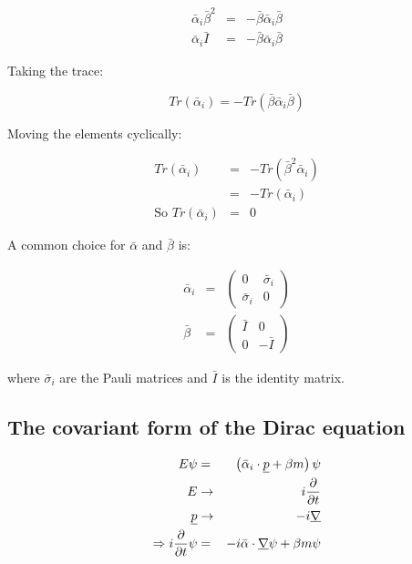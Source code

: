 \begin{eqnarray*}
  \bar{\alpha}_i\bar{\beta}^2 & = & -\bar{\beta}\bar{\alpha}_i\bar{\beta} \\
  \bar{\alpha}_i\bar{I} & = & -\bar{\beta}\bar{\alpha}_i\bar{\beta}
\end{eqnarray*}

Taking the trace:

\[
  Tr\left(\bar{\alpha}_i\right) = -Tr\left(\bar{\beta}\bar{\alpha}_i\bar{\beta}\right)
\]

Moving the elements cyclically:

\begin{eqnarray*}
  Tr\left(\bar{\alpha}_i\right) & = & - Tr\left(\bar{\beta}^2\bar{\alpha}_i\right) \\
  & = & - Tr\left(\bar{\alpha}_i\right) \\
  \textrm{So } Tr\left(\bar{\alpha}_i\right) & = & 0
\end{eqnarray*}

A common choice for $\bar{\alpha}$ and $\bar{\beta}$ is:

\begin{eqnarray*}
  \bar{\alpha}_i & = &
  \left(
    \begin{array}{cc}
    0 & \bar{\sigma}_i \\
    \bar{\sigma}_i & 0
    \end{array}
  \right)
  \\
  \bar{\beta} & = &
  \left(
    \begin{array}{cc}
    \bar{I} & 0 \\
    0 & -\bar{I}
    \end{array}
  \right)
\end{eqnarray*}

where $\bar{\sigma}_i$ are the Pauli matrices and $\bar{I}$ is the identity matrix.

\subsection{The covariant form of the Dirac equation}

\begin{eqnarray*}
  E\psi & = & \left(\bar{\alpha}_i\cdot\underline{p} + \beta m\right) \psi \\
  E & \to & i\frac{\partial}{\partial t} \\
  \underline{p} & \to & -i\underline{\nabla} \\
  \Rightarrow i\frac{\partial}{\partial t}\psi & = & -i \bar{\alpha}\cdot\underline{\nabla}\psi + \beta m\psi \\
\end{eqnarray*}

